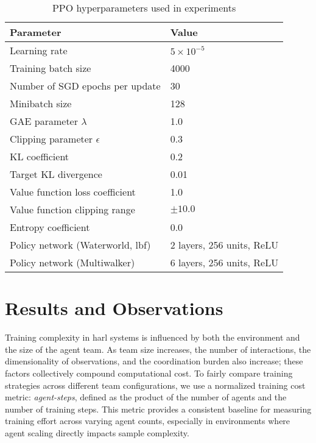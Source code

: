 \documentclass{article}
\begin{document}
\begin{table}[ht]
    \centering
    \caption{PPO hyperparameters used in experiments}
    \begin{tabular}{ll}
    \toprule
    \textbf{Parameter} & \textbf{Value} \\
    \midrule
    Learning rate & $5 \times 10^{-5}$ \\
    Training batch size & 4000 \\
    Number of SGD epochs per update & 30 \\
    Minibatch size & 128 \\
    GAE parameter $\lambda$ & 1.0 \\
    Clipping parameter $\epsilon$ & 0.3 \\
    KL coefficient & 0.2 \\
    Target KL divergence & 0.01 \\
    Value function loss coefficient & 1.0 \\
    Value function clipping range & $\pm 10.0$ \\
    Entropy coefficient & 0.0 \\
    Policy network (Waterworld, \gls{lbf}) & 2 layers, 256 units, ReLU \\%
    Policy network (Multiwalker) & 6 layers, 256 units, ReLU \\%
    \bottomrule
    \end{tabular}
    \label{con1:tab:ppo-hyperparams}
\end{table}

\FloatBarrier
\section{Results and Observations}
\label{con1:sec:results}

Training complexity in \gls{harl}
systems is influenced by both the environment and the size of the agent team. 
As team size increases, the number of interactions, the dimensionality of observations, 
and the coordination burden also increase; these factors collectively 
compound computational cost. To fairly compare training strategies across different 
team configurations, we use a normalized training cost metric: \emph{agent-steps}, 
defined as the product of the number of agents and the number of training steps. 
This metric provides a consistent baseline for measuring training effort across 
varying agent counts, especially in environments where agent scaling directly 
impacts sample complexity.
\end{document}
